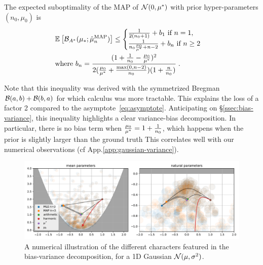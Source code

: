 \documentclass[twoside]{article}
\newcommand*{\expect}[2][]{\ensuremath{\mathbb{E}_{#1} \left[ #2 \right] }} %
\newcommand{\logpart}{A}
\newcommand{\bregmanconj}{\cB_{\logpart^*}}
\newcommand{\m}{\mu}
\begin{document}
\begin{theorem}
\label{thm:varianceMAP}
The expected suboptimality of the MAP of $\cN(0,\m^*)$ with prior hyper-parameters $(n_0,\m_0)$ is
 \begin{align}
	& \expect{\bregmanconj( \m_*; \hat \m_n^\mathrm{MAP})}
	\leq \begin{cases}
		\inv{2(n_0+1)}  +  b_1 \ \text{if}\ n=1,\\
		\frac{1}{n_0 \frac{\m_0}{\m^*} +n-2} + b_n \ \text{if}\ n\geq 2
	\end{cases}
	\label{eq:MAP_rate}\\
	& \text{where }b_n = \frac{(1 + \inv{n_0} - \frac{\m_0}{\m^*})^2}{2 (\frac{\m_0}{\m^*}+\frac{\max(0,n-2)}{n_0})(1 + \frac{n}{n_0} )} \; . \nonumber
\end{align}
\end{theorem}
Note that this inequality was derived with the symmetrized Bregman ${\mathcal B}(a,b) + {\mathcal B}(b,a)$ for which calculus was more tractable.
This explains the loss of a factor 2 compared to the asymptote~\eqref{eq:asymptote}. 
Anticipating on \S\ref{ssec:bias-variance}, this inequality highlights a clear variance-bias decomposition.
In particular, there is no bias term when $\frac{\m_0}{\m^*} =1 + \inv{n_0} $, which happens when the prior is slightly larger than the ground truth
This correlates well with our numerical observations (cf App.\ref{app:gaussian-variance}).

\begin{figure}[t]
	\centering
	\includegraphics[width=\textwidth]{figs/thales/numerical_schema_n=3.pdf}
	\caption{A numerical illustration of the different characters featured in the bias-variance decomposition, for a 1D Gaussian ${\mathcal N}(\mu, \sigma^2)$.
	}
	\label{fig:thales}
\end{figure}
\end{document}
